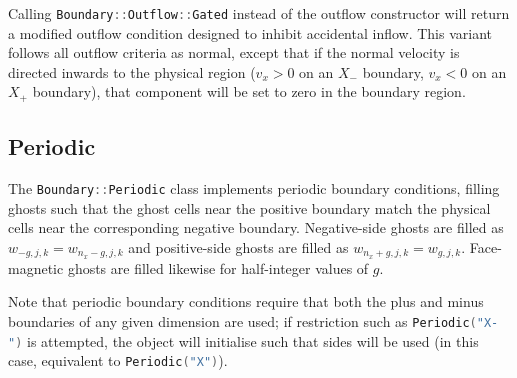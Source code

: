 \documentclass[11pt]{report}
\newcommand{\cpp}[1]{\lstinline[language=C++]{#1}}
\begin{document}
Calling \cpp{Boundary::Outflow::Gated} instead of the outflow constructor will return a modified outflow condition designed to inhibit accidental inflow. This variant follows all outflow criteria as normal, except that if the normal velocity is directed inwards to the physical region ($v_x >0$ on an $X_-$ boundary, $v_x<0$ on an $X_+$ boundary), that component will be set to zero in the boundary region. 

\subsection{Periodic}
The \cpp{Boundary::Periodic} class implements periodic boundary conditions, filling ghosts such that the ghost cells near the positive boundary match the physical cells near the corresponding negative boundary.
Negative-side ghosts are filled as $w_{-g,j,k} = w_{n_x-g,j,k}$ and positive-side ghosts are filled as $w_{n_x+g,j,k} = w_{g,j,k}$.
Face-magnetic ghosts are filled likewise for half-integer values of $g$. 

Note that periodic boundary conditions require that both the plus and minus boundaries of any given dimension are used; if restriction such as \cpp{Periodic("X-")} is attempted, the object will initialise such that sides will be used (in this case, equivalent to \cpp{Periodic("X")}).
\end{document}
